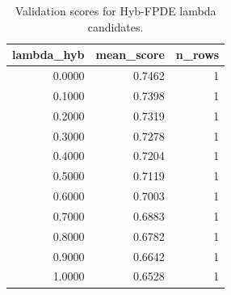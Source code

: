 \begin{table}[t]
\caption{Validation scores for Hyb-FPDE lambda candidates.}
\label{tab:lambda_distribution_computed}
\centering
\begin{tabular}{rrr}
\toprule
lambda\_hyb & mean\_score & n\_rows \\
\midrule
0.0000 & 0.7462 & 1 \\
0.1000 & 0.7398 & 1 \\
0.2000 & 0.7319 & 1 \\
0.3000 & 0.7278 & 1 \\
0.4000 & 0.7204 & 1 \\
0.5000 & 0.7119 & 1 \\
0.6000 & 0.7003 & 1 \\
0.7000 & 0.6883 & 1 \\
0.8000 & 0.6782 & 1 \\
0.9000 & 0.6642 & 1 \\
1.0000 & 0.6528 & 1 \\
\bottomrule
\end{tabular}

\end{table}
